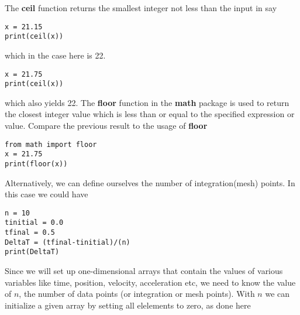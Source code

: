 \documentclass[%
oneside,                 %
final,                   %
10pt]{article}
\begin{document}
The \textbf{ceil} function returns the smallest integer not less than the input in say



\begin{verbatim}
x = 21.15
print(ceil(x))

\end{verbatim}

which in the case here is 22.



\begin{verbatim}
x = 21.75
print(ceil(x))

\end{verbatim}

which also yields 22. The  \textbf{floor} function in the \textbf{math} package
is used to return the closest integer value which is less than or equal to the specified expression or value.
Compare the previous result to the usage of \textbf{floor}




\begin{verbatim}
from math import floor
x = 21.75
print(floor(x))

\end{verbatim}


Alternatively, we can define ourselves the number of integration(mesh) points. In this case we could have






\begin{verbatim}
n = 10
tinitial = 0.0
tfinal = 0.5
DeltaT = (tfinal-tinitial)/(n)
print(DeltaT)

\end{verbatim}


Since we will set up one-dimensional arrays that contain the values of
various variables like time, position, velocity, acceleration etc, we
need to know the value of $n$, the number of data points (or
integration or mesh points).  With $n$ we can initialize a given array
by setting all elelements to zero, as done here
\end{document}
